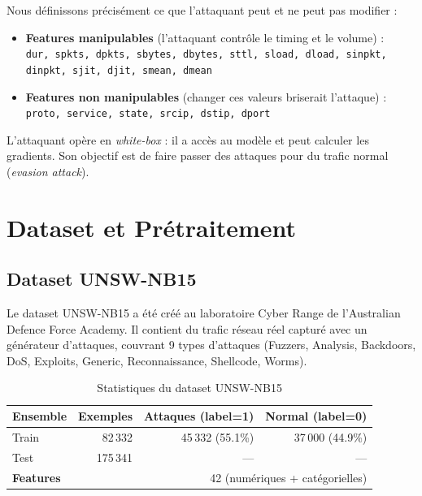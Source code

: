 \documentclass[11pt,a4paper]{article}
\begin{document}
Nous d\'efinissons pr\'ecis\'ement ce que l'attaquant peut et ne peut pas modifier :

\begin{itemize}[leftmargin=1.5em]
    \item \textbf{Features manipulables} (l'attaquant contr\^ole le timing et le volume) :\\
    \texttt{dur, spkts, dpkts, sbytes, dbytes, sttl, sload, dload, sinpkt, dinpkt, sjit, djit, smean, dmean}
    \item \textbf{Features non manipulables} (changer ces valeurs briserait l'attaque) :\\
    \texttt{proto, service, state, srcip, dstip, dport}
\end{itemize}

L'attaquant op\`ere en \emph{white-box} : il a acc\`es au mod\`ele et peut calculer les gradients.
Son objectif est de faire passer des attaques pour du trafic normal (\emph{evasion attack}).

\section{Dataset et Pr\'etraitement}

\subsection{Dataset UNSW-NB15}

Le dataset UNSW-NB15 a \'et\'e cr\'e\'e au laboratoire Cyber Range de l'Australian Defence Force Academy.
Il contient du trafic r\'eseau r\'eel captur\'e avec un g\'en\'erateur d'attaques,
couvrant 9 types d'attaques (Fuzzers, Analysis, Backdoors, DoS, Exploits, Generic, Reconnaissance, Shellcode, Worms).

\begin{table}[H]
\centering
\caption{Statistiques du dataset UNSW-NB15}
\begin{tabular}{lrrr}
\toprule
\textbf{Ensemble} & \textbf{Exemples} & \textbf{Attaques (label=1)} & \textbf{Normal (label=0)} \\
\midrule
Train & 82\,332  & 45\,332 (55.1\%) & 37\,000 (44.9\%) \\
Test  & 175\,341 & --- & --- \\
\midrule
\multicolumn{2}{l}{\textbf{Features}} & \multicolumn{2}{r}{42 (num\'eriques + cat\'egorielles)} \\
\bottomrule
\end{tabular}
\end{table}
\end{document}
